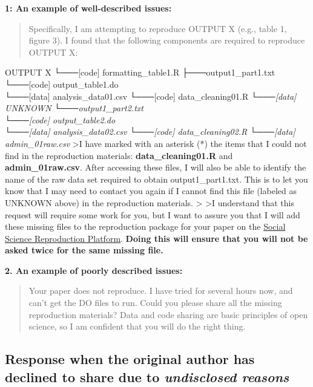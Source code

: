 \documentclass[
]{book}
\begin{document}
\textbf{1: An example of well-described issues:}

\begin{quote}
Specifically, I am attempting to reproduce OUTPUT X (e.g., table 1, figure 3). I found that the following components are required to reproduce OUTPUT X:
\end{quote}

OUTPUT X
└───{[}code{]} formatting\_table1.R
├───output1\_part1.txt\\
\textbar{} └───{[}code{]} output\_table1.do\\
\textbar{} └───{[}data{]} analysis\_data01.csv
\textbar{} └───{[}code{]} data\_cleaning01.R\emph{
\textbar{} └───{[}data{]} UNKNOWN
└───output1\_part2.txt\\
└───{[}code{]} output\_table2.do\\
└───{[}data{]} analysis\_data02.csv
└───{[}code{]} data\_cleaning02.R
└───{[}data{]} admin\_01raw.csv}
\textgreater I have marked with an asterisk (*) the items that I could not find in the reproduction materials: \textbf{data\_cleaning01.R} and \textbf{admin\_01raw.csv}. After accessing these files, I will also be able to identify the name of the raw data set required to obtain output1\_part1.txt. This is to let you know that I may need to contact you again if I cannot find this file (labeled as UNKNOWN above) in the reproduction materials.
\textgreater{}
\textgreater I understand that this request will require some work for you, but I want to assure you that I will add these missing files to the reproduction package for your paper on the \href{https://www.socialsciencereproduction.org/}{Social Science Reproduction Platform}. \textbf{Doing this will ensure that you will not be asked twice for the same missing file.}

\textbf{2. An example of poorly described issues:}

\begin{quote}
Your paper does not reproduce. I have tried for several hours now, and can't get the DO files to run. Could you please share all the missing reproduction materials? Data and code sharing are basic principles of open science, so I am confident that you will do the right thing.
\end{quote}

\hypertarget{response-when-the-original-author-has-declined-to-share-due-to-undisclosed-reasons}{%
\subsection{\texorpdfstring{Response when the original author has declined to share due to \emph{undisclosed reasons}}{Response when the original author has declined to share due to undisclosed reasons}}\label{response-when-the-original-author-has-declined-to-share-due-to-undisclosed-reasons}}
\end{document}
